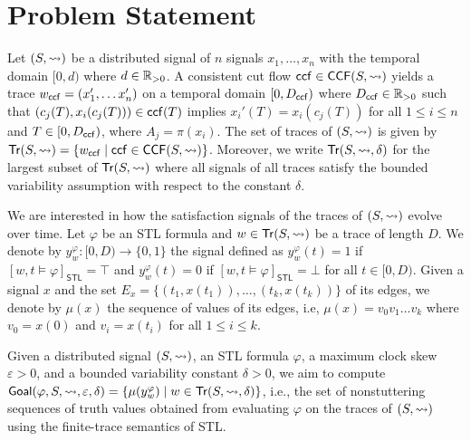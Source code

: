\section{Problem Statement}
Let $(S,{\rightsquigarrow})$ be a distributed signal of $n$ signals $x_1, \ldots, x_n$ with the temporal domain $[0,d)$ where $d \in \mathbb{R}_{> 0}$.
A consistent cut flow $\mathsf{ccf} \in \mathsf{CCF}(S,{\rightsquigarrow})$ yields a trace $w_{\mathsf{ccf}} = 
(x'_1, \ldots x'_n)$  
on a temporal domain $[0,D_{\mathsf{ccf}})$ where $D_{\mathsf{ccf}} \in \mathbb{R}_{> 0}$ such that $(c_j(T), 
x_i(c_j(T))) \in \mathsf{ccf}(T)$ implies $x_i'(T) = x_i(c_j(T))$ for all $1 \leq i \leq n$ 
and $T \in [0, D_{\mathsf{ccf}})$, where $A_j = \pi(x_i)$.
The set of traces of $(S,{\rightsquigarrow})$ is given by $\tr(S,{\hb}) = \{ w_{\ccf} \st \ccf \in \CCF(S,{\hb})\}$.
Moreover, we write $\mathsf{Tr}(S,{\rightsquigarrow},\delta)$ for the largest subset of $\mathsf{Tr}(S,{\rightsquigarrow})$ where all signals of all traces satisfy the bounded variability assumption with respect to the constant $\delta$.

We are interested in how the satisfaction signals of the traces of $(S,{\rightsquigarrow})$ evolve over time.
Let $\varphi$ be an STL formula and $w \in \mathsf{Tr}(S,{\rightsquigarrow})$ be a trace of length $D$.
We denote by $y_w^\varphi : [0,D) \to \{0,1\}$ the signal defined as $y_w^\varphi(t) = 1$ if $[w, t \models \varphi]_{\mathsf{STL}} = \top$ and $y_w^\varphi(t) = 0$ if $[w, t \models \varphi]_{\mathsf{STL}} = \bot$ for all $t \in [0,D)$.
Given a signal $x$ and the set $E_x = \{(t_1, x(t_1)), \ldots, (t_k, x(t_k))\}$ of its edges, we denote by $\mu(x)$ the sequence of values of its edges, i.e, $\mu(x) = v_0 v_1 \ldots v_k$ where $v_0 = x(0)$ and $v_i = x(t_i)$ for all $1 \leq i \leq k$.

Given a distributed signal $(S, {\rightsquigarrow})$, an STL formula $\varphi$, a maximum clock skew $\varepsilon > 0$, and a bounded variability constant $\delta > 0$, we aim to compute $\mathsf{Goal}(\varphi, S, {\hb}, \varepsilon, \delta) = \{ \mu(y_w^\varphi) \st w \in \tr(S, {\hb}, \delta) \}$, i.e., the set of nonstuttering sequences of truth values obtained from evaluating $\varphi$ on the traces of $(S, {\rightsquigarrow})$ using the finite-trace semantics of STL.